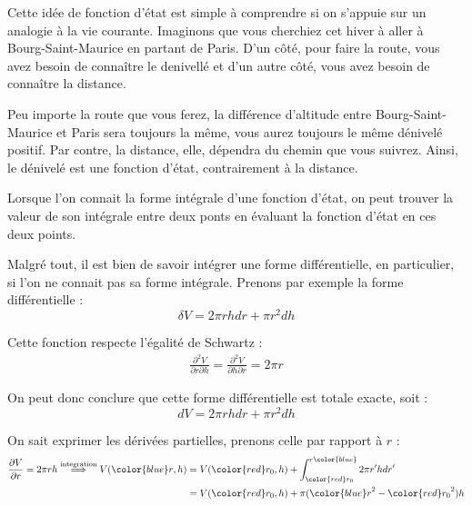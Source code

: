 Cette idée de fonction d'état est simple à comprendre si on s'appuie sur un analogie à la vie courante. Imaginons que vous cherchiez cet hiver à aller à Bourg-Saint-Maurice en partant de Paris. D'un côté, pour faire la route, vous avez besoin de connaître le denivellé et d'un autre côté, vous avez besoin de connaître la distance. 

Peu importe la route que vous ferez, la différence d'altitude entre Bourg-Saint-Maurice et Paris sera toujours la même, vous aurez toujours le même dénivelé positif. Par contre, la distance, elle, dépendra du chemin que vous suivrez. Ainsi, le dénivelé est une fonction d'état, contrairement à la distance.



Lorsque l'on connait la forme intégrale d'une fonction d'état, on peut trouver la valeur de son intégrale entre deux ponts en évaluant la fonction d'état en ces deux points. 

Malgré tout, il est bien de savoir intégrer une forme différentielle, en particulier, si l'on ne connait pas sa forme intégrale. Prenons par exemple la forme différentielle :
\begin{equation*}
\delta V = 2 \pi r h dr + \pi r^2 dh
\end{equation*}

Cette fonction respecte l'égalité de Schwartz : 
\begin{align*}
\frac{\partial^2 V}{\partial r \partial h} = \frac{\partial^2 V}{\partial h \partial r} = 2 \pi r
\end{align*}

On peut donc conclure que cette forme différentielle est totale exacte, soit :  
\begin{equation*}
d V = 2 \pi r h dr + \pi r^2 dh
\end{equation*}

On sait exprimer les dérivées partielles, prenons celle par rapport à $r$ : 
\begin{align*}
\frac{\partial V}{\partial r} = 2 \pi r h \stackrel{\text{integration}}{\implies} V({\color{blue} r}, h) &= V({\color{red} r_0}, h) + \int_{\color{red} r_0}^{r \color{blue}}  2\pi r' h dr'\\
&= V({\color{red} r_0}, h) + \pi ({\color{blue} r}^2-{\color{red} r_0}^2) h
\end{align*}

